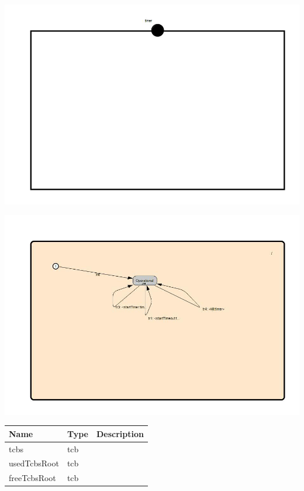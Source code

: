 
{
\centering{}
\includegraphics[width=1.0\textwidth]{./images/ATimingService_structure.jpg}
}


{
\centering{}
\includegraphics[width=1.0\textwidth]{./images/ATimingService_behavior.jpg}
}

\begin{par}

\end{par}


\begin{tabular}[ht]{|l|l|p{8cm}|}
\hline
\textbf{Name} & \textbf{Type} & \textbf{Description}\\
\hline
tcbs & tcb & \\
\hline
usedTcbsRoot & tcb & \\
\hline
freeTcbsRoot & tcb & \\
\hline
\end{tabular}

